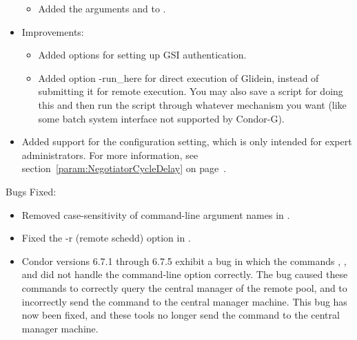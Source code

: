 \begin{itemize}
\begin{itemize}
  \item Added the  arguments  and
   to .

\end{itemize}

\item {} Improvements:

\begin{itemize}

  \item Added  options for setting up GSI authentication.

  \item Added  option {-run\_here} for direct
  execution of Glidein, instead of submitting it for remote execution.
  You may also save a script for doing this and then run the script
  through whatever mechanism you want (like some batch system
  interface not supported by Condor-G).

\end{itemize}

\item Added support for the 
  configuration setting, which is only intended for expert
  administrators.
  For more information, see section~\ref{param:NegotiatorCycleDelay}
  on page~\pageref{param:NegotiatorCycleDelay}.


\end{itemize}

\noindent Bugs Fixed:

\begin{itemize}

\item Removed case-sensitivity of command-line argument names in
.

\item Fixed the {-r} (remote schedd) option in .

\item Condor versions 6.7.1 through 6.7.5 exhibit a bug in
  which the commands , , and
   did not handle the  command-line option
  correctly.
  The bug caused these commands to correctly query the central manager
  of the remote pool,
  and to incorrectly send the command to the central manager machine.
  This bug has now been fixed, and these tools no longer send
  the command to the central manager machine.

\end{itemize}

